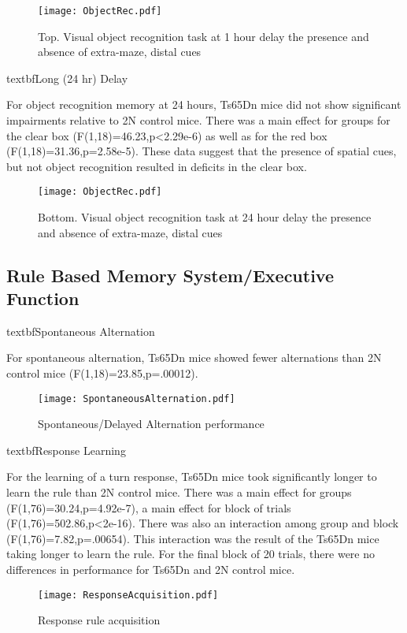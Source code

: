 \documentclass{article}
\begin{document}
\begin{figure}[h!]
\centering
\texttt{[image: ObjectRec.pdf]}
\caption{Top. Visual object recognition task at 1 hour delay the presence and absence of extra-maze, distal cues}
\label{fig:ObjectRecognition}
\end{figure}

textbf{Long (24 hr) Delay}

For object recognition memory at 24 hours, Ts65Dn mice did not show significant impairments relative to 2N control mice. There was a main effect for groups for the clear box (F(1,18)=46.23,p<2.29e-6) as well as for the red box (F(1,18)=31.36,p=2.58e-5). These data suggest that the presence of spatial cues, but not object recognition resulted in deficits in the clear box.

\begin{figure}[h!]
\centering
\texttt{[image: ObjectRec.pdf]}
\caption{Bottom. Visual object recognition task at 24 hour delay the presence and absence of extra-maze, distal cues}
\label{fig:ObjectRecognition}
\end{figure}

\subsection{Rule Based Memory System/Executive Function}

textbf{Spontaneous Alternation}

For spontaneous alternation, Ts65Dn mice showed fewer alternations than 2N control mice (F(1,18)=23.85,p=.00012).

\begin{figure}[h!]
\centering
\texttt{[image: SpontaneousAlternation.pdf]}
\caption{Spontaneous/Delayed Alternation performance}
\label{fig:SpontaneousAlternation}
\end{figure}

textbf{Response Learning}

For the learning of a turn response, Ts65Dn mice took significantly longer to learn the rule than 2N control mice. There was a main effect for groups (F(1,76)=30.24,p=4.92e-7), a main effect for block of trials (F(1,76)=502.86,p<2e-16). There was also an interaction among group and block (F(1,76)=7.82,p=.00654). This interaction was the result of the Ts65Dn mice taking longer to learn the rule. For the final block of 20 trials, there were no differences in performance for Ts65Dn and 2N control mice.

\begin{figure}[h!]
\centering
\texttt{[image: ResponseAcquisition.pdf]}
\caption{Response rule acquisition}
\label{fig:ResponseAcquisition}
\end{figure}
\end{document}
